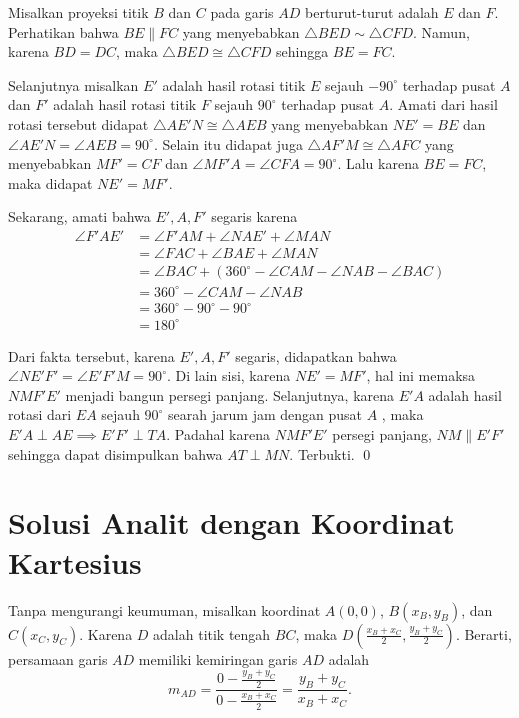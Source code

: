 \documentclass[a4paper, 12pt]{scrartcl}
\begin{document}
Misalkan proyeksi titik $B$ dan $C$ pada garis $AD$ berturut-turut adalah $E$ dan $F$. Perhatikan bahwa $BE \parallel FC$ yang menyebabkan $\triangle BED \sim \triangle CFD$. Namun, karena $BD=DC$, maka $\triangle BED \cong \triangle CFD$ sehingga $BE=FC$. 

Selanjutnya misalkan $E'$ adalah hasil rotasi titik $E$ sejauh $-90^\circ$ terhadap pusat $A$ dan $F'$  adalah hasil rotasi titik $F$ sejauh $90^\circ$ terhadap pusat $A$. Amati dari hasil rotasi tersebut didapat $\triangle AE'N \cong \triangle AEB$ yang menyebabkan $NE'=BE$ dan $\angle AE'N = \angle AEB = 90^\circ$. Selain itu didapat juga $\triangle AF'M \cong \triangle AFC$ yang menyebabkan $MF'=CF$ dan $\angle MF'A = \angle CFA = 90^\circ$. Lalu karena $BE=FC$,  maka didapat $NE'=MF'$.

Sekarang, amati bahwa $E',A,F'$ segaris karena
\begin{equation*}
\begin{split}
\angle F'AE' &= \angle F'AM + \angle NAE' +  \angle MAN\\
			&= \angle FAC + \angle BAE + \angle MAN\\
			&= \angle BAC + (360^\circ - \angle CAM - \angle NAB - \angle BAC)\\
			&= 360^\circ - \angle CAM - \angle NAB\\
			&= 360^\circ - 90^\circ - 90^\circ\\
			&= 180^\circ
\end{split}
\end{equation*}

Dari fakta tersebut, karena $E',A,F'$ segaris, didapatkan bahwa $\angle NE'F' = \angle E'F'M=90^\circ$. Di lain sisi, karena $NE' = MF'$, hal ini memaksa $NMF'E'$ menjadi bangun persegi panjang. Selanjutnya, karena $E'A$ adalah hasil rotasi dari $EA$ sejauh $90^\circ$ searah jarum jam dengan pusat $A$ , maka $E'A \perp AE \implies E'F' \perp TA$. Padahal karena $NMF'E'$ persegi panjang, $NM \parallel E'F'$ sehingga dapat disimpulkan bahwa $AT \perp MN$. Terbukti. \qed

\newpage
\section{Solusi Analit dengan Koordinat Kartesius}
Tanpa mengurangi keumuman, misalkan koordinat $A(0,0)$, $B(x_B,y_B)$, dan $C(x_C,y_C)$. Karena $D$ adalah titik tengah $BC$, maka $D(\frac{x_B+x_C}{2},\frac{y_B+y_C}{2})$. Berarti, persamaan garis $AD$ memiliki kemiringan garis $AD$ adalah
$$m_{AD}=\dfrac{0-\frac{y_B+y_C}{2}}{0-\frac{x_B+x_C}{2}}=\dfrac{y_B+y_C}{x_B+x_C}.$$
\end{document}
